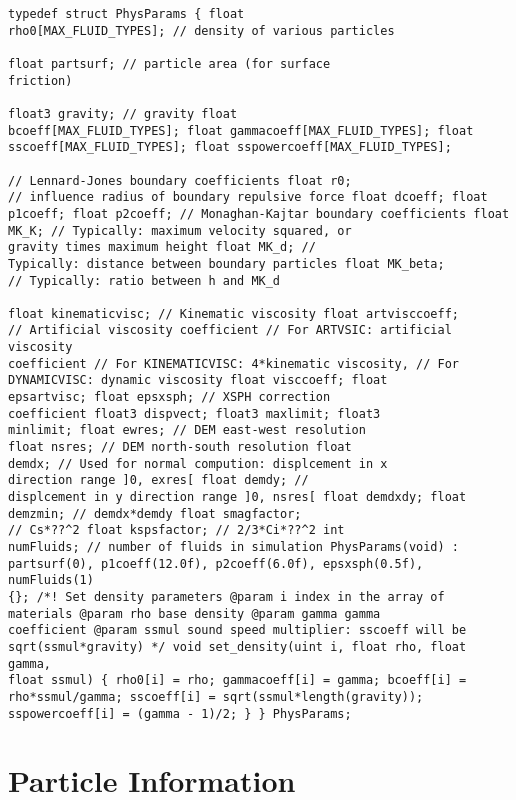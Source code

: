 \documentclass[12pt]{memoir}
\begin{document}
\begin{verbatim} 
typedef struct PhysParams { float
rho0[MAX_FLUID_TYPES]; // density of various particles

float partsurf; // particle area (for surface
friction)

float3 gravity; // gravity float
bcoeff[MAX_FLUID_TYPES]; float gammacoeff[MAX_FLUID_TYPES]; float
sscoeff[MAX_FLUID_TYPES]; float sspowercoeff[MAX_FLUID_TYPES];

// Lennard-Jones boundary coefficients float r0;
// influence radius of boundary repulsive force float dcoeff; float
p1coeff; float p2coeff; // Monaghan-Kajtar boundary coefficients float
MK_K; // Typically: maximum velocity squared, or
gravity times maximum height float MK_d; //
Typically: distance between boundary particles float MK_beta;
// Typically: ratio between h and MK_d

float kinematicvisc; // Kinematic viscosity float artvisccoeff;
// Artificial viscosity coefficient // For ARTVSIC: artificial viscosity
coefficient // For KINEMATICVISC: 4*kinematic viscosity, // For
DYNAMICVISC: dynamic viscosity float visccoeff; float
epsartvisc; float epsxsph; // XSPH correction
coefficient float3 dispvect; float3 maxlimit; float3
minlimit; float ewres; // DEM east-west resolution
float nsres; // DEM north-south resolution float
demdx; // Used for normal compution: displcement in x
direction range ]0, exres[ float demdy; //
displcement in y direction range ]0, nsres[ float demdxdy; float
demzmin; // demdx*demdy float smagfactor;
// Cs*??^2 float kspsfactor; // 2/3*Ci*??^2 int
numFluids; // number of fluids in simulation PhysParams(void) :
partsurf(0), p1coeff(12.0f), p2coeff(6.0f), epsxsph(0.5f), numFluids(1)
{}; /*! Set density parameters @param i index in the array of
materials @param rho base density @param gamma gamma
coefficient @param ssmul sound speed multiplier: sscoeff will be
sqrt(ssmul*gravity) */ void set_density(uint i, float rho, float gamma,
float ssmul) { rho0[i] = rho; gammacoeff[i] = gamma; bcoeff[i] =
rho*ssmul/gamma; sscoeff[i] = sqrt(ssmul*length(gravity));
sspowercoeff[i] = (gamma - 1)/2; } } PhysParams;

\end{verbatim}


\section{Particle Information}
\end{document}
